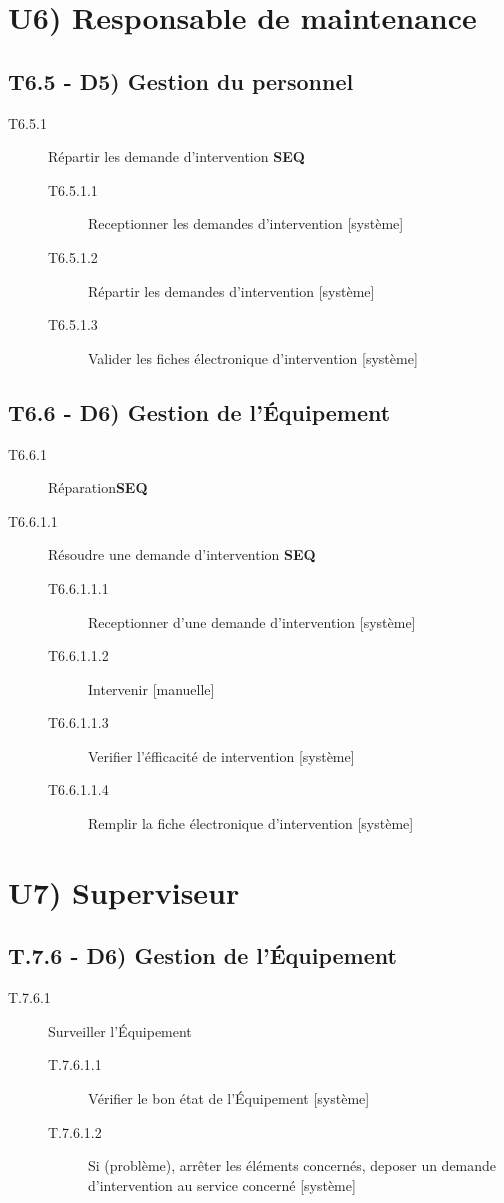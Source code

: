 \section{U6) Responsable de maintenance}
	\subsection{T6.5 - D5) Gestion du personnel}
	\begin{description}
	\item[T6.5.1] Répartir les demande d'intervention \textbf{SEQ}
		\begin{description}
		\item[T6.5.1.1] Receptionner les demandes d'intervention [système]
		\item[T6.5.1.2] Répartir les demandes d'intervention [système]
		\item[T6.5.1.3] Valider les fiches électronique d'intervention [système]
		\end{description}
	\end{description}
	
	\subsection{T6.6 - D6) Gestion de l'Équipement}
	\begin{description}
	\item[T6.6.1] Réparation\textbf{SEQ}
		\item[T6.6.1.1] Résoudre une demande d'intervention \textbf{SEQ}
		\begin{description}
			\item[T6.6.1.1.1] Receptionner d'une demande d'intervention [système]
			\item[T6.6.1.1.2] Intervenir [manuelle]
			\item[T6.6.1.1.3] Verifier l'éfficacité de intervention [système]
			\item[T6.6.1.1.4] Remplir la fiche électronique d'intervention [système]
		\end{description}
	\end{description}

\section{U7) Superviseur}

	\subsection{T.7.6 - D6) Gestion de l'Équipement}
	\begin{description}
	\item[T.7.6.1] Surveiller l'Équipement
		\begin{description}
		\item[T.7.6.1.1] Vérifier le bon état de l'Équipement [système]
		\item[T.7.6.1.2] Si (problème), arrêter les éléments concernés, deposer un
		demande d'intervention au service concerné [système]
		\end{description}
	\end{description}

